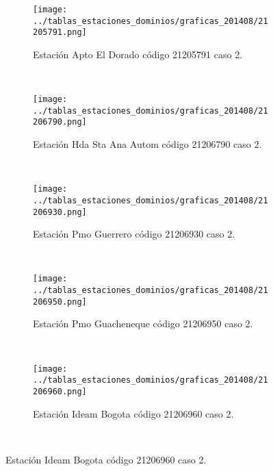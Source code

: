 \begin{figure}[H]\ContinuedFloat
\centering
\begin{subfigure}[normla]{0.4\textwidth}
\texttt{[image: ../tablas\_estaciones\_dominios/graficas\_201408/21205791.png]}
\caption{Estación Apto El Dorado código 21205791 caso 2.}
\end{subfigure}
~
\begin{subfigure}[normla]{0.4\textwidth}
\texttt{[image: ../tablas\_estaciones\_dominios/graficas\_201408/21206790.png]}
\caption{Estación Hda Sta Ana Autom código 21206790 caso 2.}
\end{subfigure}
~
\begin{subfigure}[normla]{0.4\textwidth}
\texttt{[image: ../tablas\_estaciones\_dominios/graficas\_201408/21206930.png]}
\caption{Estación Pmo Guerrero código 21206930 caso 2.}
\end{subfigure}
~
\begin{subfigure}[normla]{0.4\textwidth}
\texttt{[image: ../tablas\_estaciones\_dominios/graficas\_201408/21206950.png]}
\caption{Estación Pmo Guacheneque código 21206950 caso 2.}
\end{subfigure}
~
\begin{subfigure}[normla]{0.4\textwidth}
\texttt{[image: ../tablas\_estaciones\_dominios/graficas\_201408/21206960.png]}
\caption{Estación Ideam Bogota código 21206960 caso 2.}
\end{subfigure}
~
~
\end{figure}
 
